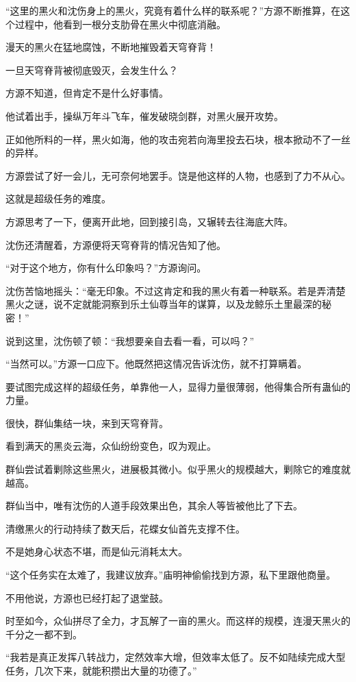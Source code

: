 \begin{this_body}
“这里的黑火和沈伤身上的黑火，究竟有着什么样的联系呢？”方源不断推算，在这个过程中，他看到一根分支肋骨在黑火中彻底消融。

漫天的黑火在猛地腐蚀，不断地摧毁着天穹脊背！

一旦天穹脊背被彻底毁灭，会发生什么？

方源不知道，但肯定不是什么好事情。

他试着出手，操纵万年斗飞车，催发破晓剑群，对黑火展开攻势。

正如他所料的一样，黑火如海，他的攻击宛若向海里投去石块，根本掀动不了一丝的异样。

方源尝试了好一会儿，无可奈何地罢手。饶是他这样的人物，也感到了力不从心。

这就是超级任务的难度。

方源思考了一下，便离开此地，回到接引岛，又辗转去往海底大阵。

沈伤还清醒着，方源便将天穹脊背的情况告知了他。

“对于这个地方，你有什么印象吗？”方源询问。

沈伤苦恼地摇头：“毫无印象。不过这肯定和我的黑火有着一种联系。若是弄清楚黑火之谜，说不定就能洞察到乐土仙尊当年的谋算，以及龙鲸乐土里最深的秘密！”

说到这里，沈伤顿了顿：“我想要亲自去看一看，可以吗？”

“当然可以。”方源一口应下。他既然把这情况告诉沈伤，就不打算瞒着。

要试图完成这样的超级任务，单靠他一人，显得力量很薄弱，他得集合所有蛊仙的力量。

很快，群仙集结一块，来到天穹脊背。

看到满天的黑炎云海，众仙纷纷变色，叹为观止。

群仙尝试着剿除这些黑火，进展极其微小。似乎黑火的规模越大，剿除它的难度就越高。

群仙当中，唯有沈伤的人道手段效果出色，其余人等皆被他比了下去。

清缴黑火的行动持续了数天后，花蝶女仙首先支撑不住。

不是她身心状态不堪，而是仙元消耗太大。

“这个任务实在太难了，我建议放弃。”庙明神偷偷找到方源，私下里跟他商量。

不用他说，方源也已经打起了退堂鼓。

时至如今，众仙拼尽了全力，才瓦解了一亩的黑火。而这样的规模，连漫天黑火的千分之一都不到。

“我若是真正发挥八转战力，定然效率大增，但效率太低了。反不如陆续完成大型任务，几次下来，就能积攒出大量的功德了。”


\end{this_body}
